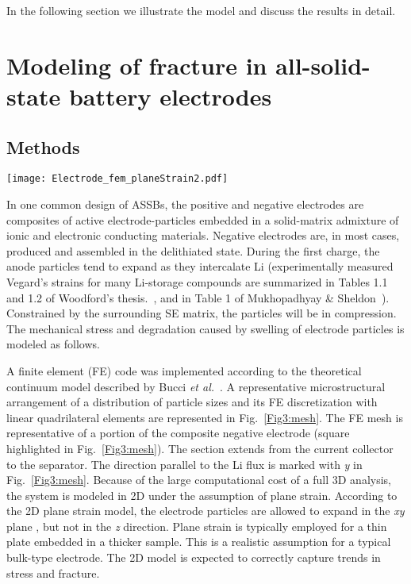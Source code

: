\documentclass[final,5p,sort&compress]{elsarticle}
\begin{document}
In the following section we illustrate the model and discuss the results in detail.




\section{Modeling of fracture in all-solid-state battery electrodes}
\label{sec:fracture_SE}

\subsection*{Methods}

\begin{figure*}
\centering
\texttt{[image: Electrode\_fem\_planeStrain2.pdf]} 
\caption{Geometry, discretization and boundary conditions of a finite element model of a composite electrode. Electrode particles are  embedded in a mixed conductor, consisting of a solid electrolyte and an electronically conductive additive.}
\label{Fig3:mesh}
\end{figure*}
In one common design of ASSBs, the positive and negative electrodes are composites of active electrode-particles embedded in a solid-matrix admixture of ionic and electronic conducting materials.
Negative electrodes are, in most cases, produced and assembled in the delithiated state. During the first charge, the anode particles tend to expand as they intercalate Li 
(experimentally measured Vegard's strains for many Li-storage compounds are summarized in Tables 1.1 and 1.2 of Woodford's thesis.~\cite{woodford:thesis}, and in Table 1 of Mukhopadhyay \& Sheldon~\cite{Mukhopadhyay2014}).
Constrained by the surrounding SE matrix, the particles will be in compression.
The  mechanical stress and degradation caused by swelling of electrode particles is modeled as follows.

A finite element (FE) code was implemented according to the theoretical continuum model described by Bucci \emph{et al.}~\cite{bucciActaMat2015}. 
%
A representative microstructural arrangement of a distribution of particle sizes
and its FE discretization with linear quadrilateral elements are represented in Fig.~\ref{Fig3:mesh}. 
%
The FE mesh is representative of a portion of the composite negative electrode (square highlighted in Fig.~\ref{Fig3:mesh}). The section extends from the current collector to the separator. The direction parallel to the Li flux is marked with \emph{y} in Fig.~\ref{Fig3:mesh}. 
Because of the large computational cost of a full 3D analysis, the system is modeled in 2D under the assumption of plane strain. 
According to the 2D plane strain model, the electrode particles are allowed to expand in the \emph{xy} plane , but not in the \emph{z} direction.
Plane strain is typically employed for a thin plate embedded in a thicker sample.
This is a realistic assumption for a typical bulk-type electrode. The  2D model is expected  to correctly capture trends in stress and fracture.
\end{document}
